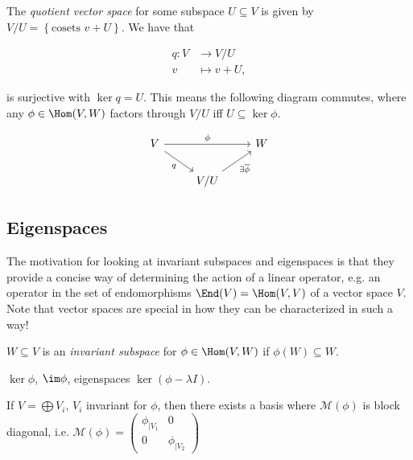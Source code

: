 \documentclass{notes}
\begin{document}
\begin{defn}
    The \emph{quotient vector space} for some subspace $U\subseteq V$ is given by $V/U=\left\{ \text{cosets } v+U \right\} $. We have that

    \begin{align*}
        q\colon V &\longrightarrow V/U \\
        v &\longmapsto v+U
    ,\end{align*}

    is surjective with $\ker q=U$. This means the following diagram commutes, where any $\phi \in \Hom(V,W)$ factors through $V/U$ iff $U\subseteq \ker\phi $.

\[\begin{tikzcd}
	V && W \\
	& {V/U}
	\arrow["\phi", from=1-1, to=1-3]
	\arrow["q"', from=1-1, to=2-2]
	\arrow["{\exists \overline{\phi}}"', from=2-2, to=1-3]
\end{tikzcd}\]
\end{defn}

\subsection{Eigenspaces}

The motivation for looking at invariant subspaces and eigenspaces is that they provide a concise way of determining the action of a linear operator, e.g. an operator in the set of endomorphisms $\End(V)=\Hom(V,V)$ of a vector space $V$. Note that vector spaces are special in how they can be characterized in such a way!

\begin{defn}
    $W\subseteq V$ is an \emph{invariant subspace} for $\phi \in \Hom(V,W)$ if $\phi(W)\subseteq W $.
\end{defn}

\begin{example}
    $\ker \phi$, $\im \phi$, eigenspaces $\ker (\phi -\lambda I)$.
\end{example}

\begin{theorem}
If $V=\bigoplus V_i$, $V_i$ invariant for $\phi $, then there exists a basis where $\mathcal{M} (\phi )$ is block diagonal, i.e. $\mathcal{M} (\phi )=\begin{pmatrix} \phi _{\mid V_1} & 0 \\ 0 & \phi _{\mid V_2} \end{pmatrix} $ 
\end{theorem}
\end{document}
